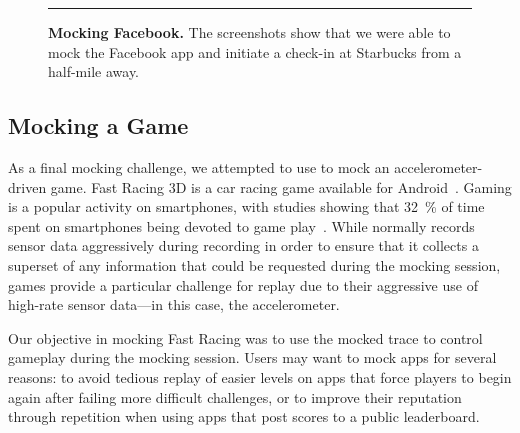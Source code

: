 \begin{figure}[t]
\caption{\textbf{Mocking Facebook.} The screenshots show that we were able to
mock the Facebook app and initiate a check-in at Starbucks from a half-mile
away.}

\vspace*{0.1in}
\hrule
\vspace*{-0.15in}

\label{fig-mocking-facebook}

\end{figure}

\subsection{Mocking a Game}

As a final mocking challenge, we attempted to use \PocketMocker{} to mock an
accelerometer-driven game. Fast Racing 3D is a car racing game available for
Android~\cite{fastracing-playstore-url}. Gaming is a popular activity on
smartphones, with studies showing that 32~\% of time spent on smartphones
being devoted to game play~\cite{flurry-smartphoneuse}. While \PocketMocker{}
normally records sensor data aggressively during recording in order to ensure
that it collects a superset of any information that could be requested during
the mocking session, games provide a particular challenge for replay due to
their aggressive use of high-rate sensor data---in this case, the
accelerometer.

Our objective in mocking Fast Racing was to use the mocked trace to control
gameplay during the mocking session. Users may want to mock apps for several
reasons: to avoid tedious replay of easier levels on apps that force players
to begin again after failing more difficult challenges, or to improve their
reputation through repetition when using apps that post scores to a public
leaderboard.


